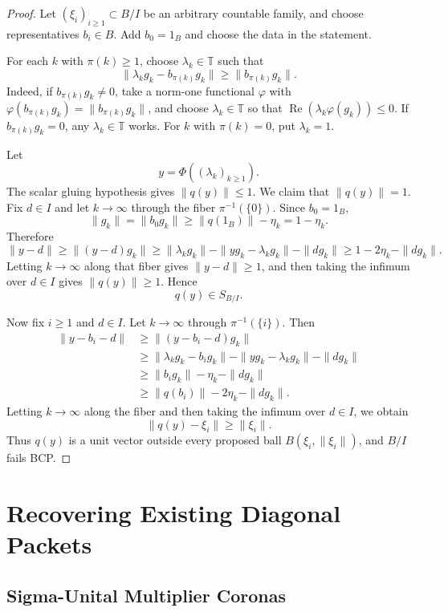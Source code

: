 \documentclass[11pt]{article}
\newcommand{\T}{\mathbb T}
\begin{document}
\begin{proof}
Let \((\xi_i)_{i\ge1}\subset B/I\) be an arbitrary countable family, and
choose representatives \(b_i\in B\).  Add \(b_0=1_B\) and choose the data in
the statement.

For each \(k\) with \(\pi(k)\ge1\), choose \(\lambda_k\in\T\) such that
\[
        \|\lambda_kg_k-b_{\pi(k)}g_k\|\ge \|b_{\pi(k)}g_k\|.
\]
Indeed, if \(b_{\pi(k)}g_k\ne0\), take a norm-one functional \(\varphi\) with
\(\varphi(b_{\pi(k)}g_k)=\|b_{\pi(k)}g_k\|\), and choose \(\lambda_k\in\T\)
so that \(\operatorname{Re}(\lambda_k\varphi(g_k))\le0\).  If
\(b_{\pi(k)}g_k=0\), any \(\lambda_k\in\T\) works.  For \(k\) with
\(\pi(k)=0\), put \(\lambda_k=1\).

Let
\[
        y=\Phi((\lambda_k)_{k\ge1}).
\]
The scalar gluing hypothesis gives \(\|q(y)\|\le1\).  We claim that
\(\|q(y)\|=1\).  Fix \(d\in I\) and let \(k\to\infty\) through the fiber
\(\pi^{-1}(\{0\})\).  Since \(b_0=1_B\),
\[
        \|g_k\|=\|b_0g_k\|\ge \|q(1_B)\|-\eta_k=1-\eta_k.
\]
Therefore
\[
        \|y-d\|
        \ge
        \|(y-d)g_k\|
        \ge
        \|\lambda_kg_k\|-\|yg_k-\lambda_kg_k\|-\|dg_k\|
        \ge
        1-2\eta_k-\|dg_k\|.
\]
Letting \(k\to\infty\) along that fiber gives \(\|y-d\|\ge1\), and then
taking the infimum over \(d\in I\) gives \(\|q(y)\|\ge1\).  Hence
\[
        q(y)\in S_{B/I}.
\]

Now fix \(i\ge1\) and \(d\in I\).  Let \(k\to\infty\) through
\(\pi^{-1}(\{i\})\).  Then
\begin{align*}
        \|y-b_i-d\|
        &\ge \|(y-b_i-d)g_k\|\\
        &\ge \|\lambda_kg_k-b_ig_k\|-\|yg_k-\lambda_kg_k\|-\|dg_k\|\\
        &\ge \|b_ig_k\|-\eta_k-\|dg_k\|\\
        &\ge \|q(b_i)\|-2\eta_k-\|dg_k\|.
\end{align*}
Letting \(k\to\infty\) along the fiber and then taking the infimum over
\(d\in I\), we obtain
\[
        \|q(y)-\xi_i\|\ge \|\xi_i\|.
\]
Thus \(q(y)\) is a unit vector outside every proposed ball
\(B(\xi_i,\|\xi_i\|)\), and \(B/I\) fails BCP.
\end{proof}

\section*{Recovering Existing Diagonal Packets}

\subsection*{Sigma-Unital Multiplier Coronas}
\end{document}
